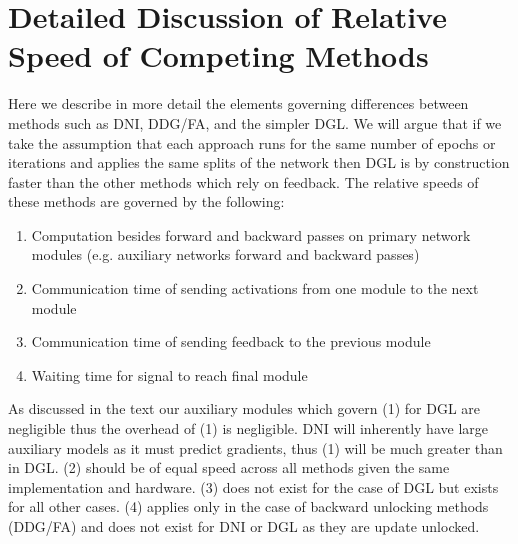 \documentclass{article}
\begin{document}
\section{Detailed Discussion of Relative Speed of Competing Methods}\label{appendix:speed}
Here we describe in more detail the elements governing differences between methods such as DNI\citep{jaderberg2016decoupled}, DDG/FA\citep{Huo2018}, and the simpler DGL. We will argue that if we take the assumption that each approach runs for the same number of epochs or iterations and applies the same splits of the network then DGL is by construction faster than the other methods which rely on feedback.   
The relative speeds of these methods are governed by the following:
\begin{enumerate}
    \item  Computation besides forward and backward passes on primary network modules (e.g. auxiliary networks forward and backward passes) 
    \item Communication time of sending activations from one module to the next module
    \item Communication time of sending feedback to the previous module 
    \item Waiting time for signal to reach final module
\end{enumerate}

As discussed in the text our auxiliary modules which govern (1) for DGL are negligible thus the overhead of (1) is negligible. DNI will inherently have large auxiliary models as it must predict gradients, thus (1) will be much greater than in DGL. (2) should be of equal speed across all methods given the same implementation and hardware. (3) does not exist for the case of DGL but exists for all other cases.  
(4) applies only in the case of backward unlocking methods (DDG/FA) and does not exist for DNI or DGL as they are update unlocked.   
\end{document}
